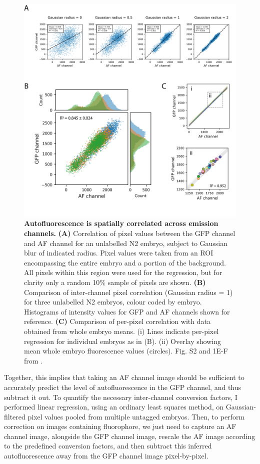 \documentclass[12pt]{"report"}
\newcommand{\mycaption}[2]{\caption[#1]{\textbf{#1.} #2}}
\begin{document}
\begin{figure}
\includegraphics[scale=0.95]{saibr_n2_correlation}
\centering
\mycaption{Autofluorescence is spatially correlated across emission channels}{
\textbf{(A)} Correlation of pixel values between the GFP channel and AF channel for an unlabelled N2 embryo, subject to Gaussian blur of indicated radius. Pixel values were taken from an ROI encompassing the entire embryo and a portion of the background. All pixels within this region were used for the regression, but for clarity only a random 10\% sample of pixels are shown.
\textbf{(B)} Comparison of inter-channel pixel correlation (Gaussian radius = 1) for three unlabelled N2 embryos, colour coded by embryo. Histograms of intensity values for GFP and AF channels shown for reference.
\textbf{(C)} Comparison of per-pixel correlation with data obtained from whole embryo means. (i) Lines indicate per-pixel regression for individual embryos as in (B). (ii) Overlay showing mean whole embryo fluorescence values (circles).
Fig. S2 and 1E-F from \textcite{Rodrigues2022}.
}
\label{fig:saibr_n2_correlation}
\end{figure}

Together, this implies that taking an AF channel image should be sufficient to accurately predict the level of autofluorescence in the GFP channel, and thus subtract it out. To quantify the necessary inter-channel conversion factors, I performed linear regression, using an ordinary least squares method, on Gaussian-filtered pixel values pooled from multiple untagged embryos. Then, to perform correction on images containing fluorophore, we just need to capture an AF channel image, alongside the GFP channel image, rescale the AF image according to the predefined conversion factors, and then subtract this inferred autofluorescence away from the GFP channel image pixel-by-pixel.\\
\end{document}
